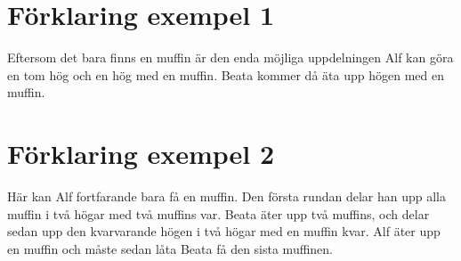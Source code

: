 \section*{Förklaring exempel 1}
Eftersom det bara finns en muffin är den enda möjliga uppdelningen Alf kan göra en tom hög och en hög med en muffin. Beata kommer då äta upp högen med en muffin. 

\section*{Förklaring exempel 2}
Här kan Alf fortfarande bara få en muffin. Den första rundan delar han upp alla muffin i två högar med två muffins var. Beata äter upp två muffins, och delar sedan upp den kvarvarande högen i två högar med en muffin kvar. Alf äter upp en muffin och måste sedan låta Beata få den sista muffinen.
